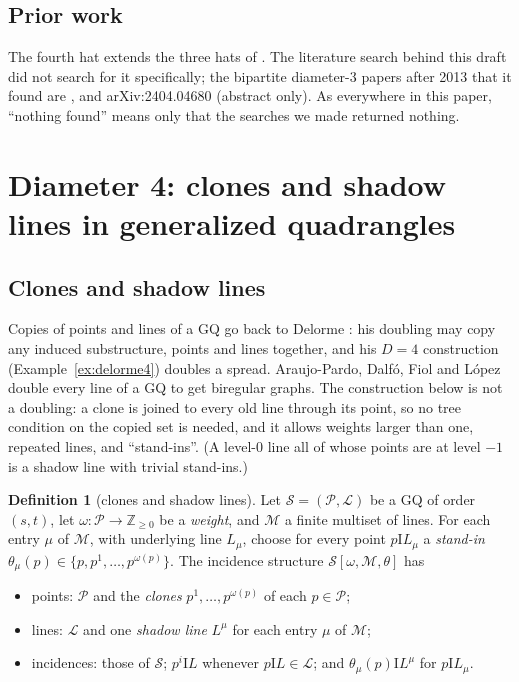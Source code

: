 \documentclass[11pt]{amsart}
\theoremstyle{definition}
\newtheorem{definition}[theorem]{Definition}
\theoremstyle{remark}
\numberwithin{equation}{section}
\newcommand{\Z}{\mathbb Z}
\newcommand{\I}{\mathrel{\mathrm I}}
\newcommand{\cL}{\mathcal L}
\newcommand{\cM}{\mathcal M}
\newcommand{\cP}{\mathcal P}
\newcommand{\cS}{\mathcal S}
\begin{document}
\subsection{Prior work}
The fourth hat extends the three hats of \cite{AL20}. The literature search behind this draft did not search for it
specifically; the bipartite diameter-3 papers after 2013 that it found are \cite{FMP13}, \cite{AL20} and
arXiv:2404.04680 (abstract only). As everywhere in this paper, ``nothing found'' means only that the searches we made
returned nothing.

\section{Diameter 4: clones and shadow lines in generalized quadrangles}\label{sec:d4}

\subsection{Clones and shadow lines}
Copies of points and lines of a GQ go back to Delorme \cite[\S\S7--8]{D85a}: his doubling may copy any induced
substructure, points and lines together, and his $D=4$ construction (Example~\ref{ex:delorme4}) doubles a spread.
Araujo-Pardo, Dalf\'o, Fiol and L\'opez \cite[Sec.~4]{ADFL21} double every line of a GQ to get biregular graphs. The
construction below is not a doubling: a clone is joined to every old line through its point, so no tree condition on the
copied set is needed, and it allows weights larger than one, repeated lines, and ``stand-ins''. (A level-0 line all of
whose points are at level $-1$ is a shadow line with trivial stand-ins.)

\begin{definition}[clones and shadow lines]\label{def:clones}
Let $\cS=(\cP,\cL)$ be a GQ of order $(s,t)$, let $\omega:\cP\to\Z_{\ge0}$ be a \emph{weight}, and $\cM$ a finite
multiset of lines. For each entry $\mu$ of $\cM$, with underlying line $L_\mu$, choose for every point $p\I L_\mu$ a
\emph{stand-in} $\theta_\mu(p)\in\{p,p^1,\dots,p^{\omega(p)}\}$. The incidence structure $\cS[\omega,\cM,\theta]$ has
\begin{itemize}
\item points: $\cP$ and the \emph{clones} $p^1,\dots,p^{\omega(p)}$ of each $p\in\cP$;
\item lines: $\cL$ and one \emph{shadow line} $L^\mu$ for each entry $\mu$ of $\cM$;
\item incidences: those of $\cS$; $p^i\I L$ whenever $p\I L\in\cL$; and $\theta_\mu(p)\I L^\mu$ for $p\I L_\mu$.
\end{itemize}
\end{definition}
\end{document}
